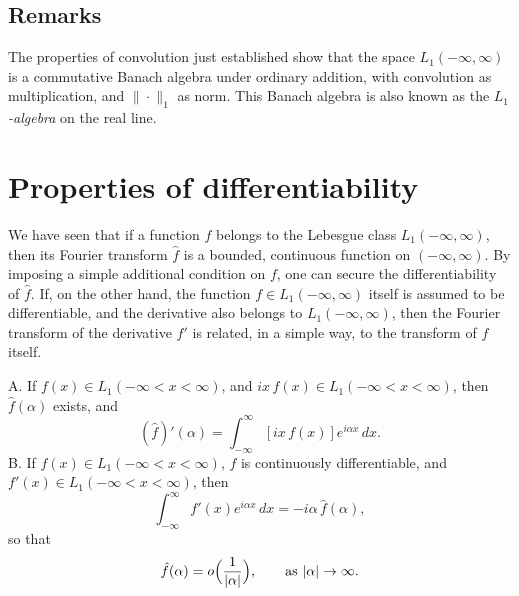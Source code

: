 \subsection*{Remarks}
The properties of convolution just established show that the space $L_1(-\infty,\infty)$ is a commutative Banach algebra under ordinary addition, with convolution as multiplication, and $\|\cdot\|_1$ as norm. This Banach algebra is also known as the \emph{$L_1$-algebra} on the real line.

\section{Properties of differentiability}
\label{sec:I-3}

We have seen that if a function $f$ belongs to the Lebesgue class $L_1(-\infty,\infty)$, then its Fourier transform $\hat f$ is a bounded, continuous function on $(-\infty,\infty)$. By imposing a simple additional condition on $f$, one can secure the differentiability of $\hat f$. If, on the other hand, the function $f\in L_1(-\infty,\infty)$ itself is assumed to be differentiable, and the derivative also belongs to $L_1(-\infty,\infty)$, then the Fourier transform of the derivative $f'$ is related, in a simple way, to the transform of $f$ itself.

\begin{theorem}\label{thm:I-3}
\textup{A.} If $f(x)\in L_1(-\infty<x<\infty)$, and $ix\,f(x)\in L_1(-\infty<x<\infty)$, then $\hat f(\alpha)$ exists, and
\begin{equation}\label{eq:I-3.A}
(\hat f)'(\alpha)=\int_{-\infty}^{\infty}[ix\,f(x)]e^{i\alpha x}\,dx.
\end{equation}
\textup{B.} If $f(x)\in L_1(-\infty<x<\infty)$, $f$ is continuously differentiable, and $f'(x)\in L_1(-\infty<x<\infty)$, then
\begin{equation}\label{eq:I-3.B}
\int_{-\infty}^{\infty}f'(x)e^{i\alpha x}\,dx=-i\alpha\,\hat f(\alpha),
\end{equation}
so that
\begin{equation}\label{eq:I-3.B2}
\hat f(\alpha)=o\Bigl(\frac{1}{|\alpha|}\Bigr),
\qquad\text{as }|\alpha|\to\infty.
\end{equation}
\end{theorem}

